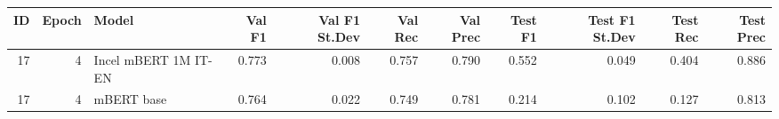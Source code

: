\begin{tabular}{rrlrrrrrrrr}
\toprule
 ID &  Epoch &                Model &  Val F1 &  Val F1 St.Dev &  Val Rec &  Val Prec &  Test F1 &  Test F1 St.Dev &  Test Rec &  Test Prec \\
\midrule
 17 &      4 & Incel mBERT 1M IT-EN &   0.773 &          0.008 &    0.757 &     0.790 &    0.552 &           0.049 &     0.404 &      0.886 \\
 17 &      4 &           mBERT base &   0.764 &          0.022 &    0.749 &     0.781 &    0.214 &           0.102 &     0.127 &      0.813 \\
\bottomrule
\end{tabular}
